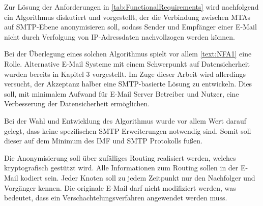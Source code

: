 Zur Lösung der Anforderungen in \autoref{tab:FunctionalRequirements} wird nachfolgend ein Algorithmus diskutiert und vorgestellt, der die Verbindung zwischen MTAs auf SMTP-Ebene anonymisieren soll, sodass Sender und Empfänger einer E-Mail nicht durch Verfolgung von IP-Adressdaten nachvollzogen werden können.

Bei der Überlegung eines solchen Algorithmus spielt vor allem \autoref{text:NFA1} eine Rolle. Alternative E-Mail Systeme mit einem Schwerpunkt auf Datensicherheit wurden bereits in Kapitel 3 vorgestellt. Im Zuge dieser Arbeit wird allerdings versucht, der Akzeptanz halber eine SMTP-basierte Lösung zu entwickeln. Dies soll, mit minimalem Aufwand für E-Mail Server Betreiber und Nutzer, eine Verbesserung der Datensicherheit ermöglichen.

Bei der Wahl und Entwicklung des Algorithmus wurde vor allem Wert darauf gelegt, dass keine spezifischen SMTP Erweiterungen notwendig sind. Somit soll dieser auf dem Minimum des IMF und SMTP Protokolls fußen.

Die Anonymisierung soll über zufälliges Routing realisiert werden, welches kryptografisch gestützt wird. Alle Informationen zum Routing sollen in der E-Mail kodiert sein. Jeder Knoten soll zu jedem Zeitpunkt nur den Nachfolger und Vorgänger kennen. Die originale E-Mail darf nicht modifiziert werden, was bedeutet, dass ein Verschachtelungsverfahren angewendet werden muss.

